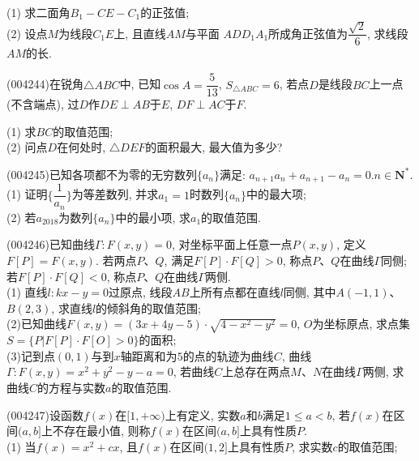 (1) 求二面角$B_1-CE-C_1$的正弦值;\\
(2) 设点$M$为线段$C_1E$上, 且直线$AM$与平面
$AD{D_1}{A_1}$所成角正弦值为$\dfrac{\sqrt 2}6$, 求线段$AM$的长.
\item (004244)在锐角$\triangle ABC$中, 已知$\cos A=\dfrac 5{13}$, $S_{\triangle ABC}=6$, 若点$D$是线段$BC$上一点(不含端点), 过$D$作$DE\perp AB$于$E$, $DF\perp AC$于$F$.
\begin{center}
\end{center}
(1) 求$BC$的取值范围;\\
(2) 问点$D$在何处时, $\triangle DEF$的面积最大, 最大值为多少?
\item (004245)已知各项都不为零的无穷数列$\{a_n\}$满足: ${a_{n+1}}a_n+{a_{n+1}}-a_n=0$.$n\in \mathbf{N}^*$.\\
(1) 证明$\{\dfrac 1{a_n}\}$为等差数列, 并求$a_1=1$时数列$\{a_n\}$中的最大项;\\
(2) 若$a_{2018}$为数列$\{a_n\}$中的最小项, 求$a_1$的取值范围.
\item (004246)已知曲线$\Gamma:F(x,y)=0$, 对坐标平面上任意一点$P(x,y)$, 定义$F[P]=F(x,y)$. 若两点$P$、$Q$, 满足$F[P]\cdot F[Q]>0$, 称点$P$、$Q$在曲线$\Gamma$同侧; 若$F[P]\cdot F[Q]<0$, 称点$P$、$Q$在曲线$\Gamma$两侧.\\
(1) 直线$l:kx-y=0$过原点, 线段$AB$上所有点都在直线$l$同侧, 其中$A(-1,1)$、$B(2,3)$, 求直线$l$的倾斜角的取值范围;\\
(2)已知曲线$F(x,y)=(3x+4y-5)\cdot \sqrt{4-x^2-y^2}=0$, $O$为坐标原点, 求点集$S=\{P|F[P]\cdot F[O]>0\}$的面积;\\
(3)记到点$(0,1)$与到$x$轴距离和为$5$的点的轨迹为曲线$C$, 曲线$\Gamma :F(x,y)=x^2+y^2-y-a=0$, 若曲线$C$上总存在两点$M$、$N$在曲线$\Gamma$两侧, 求曲线$C$的方程与实数$a$的取值范围.
\item (004247)设函数$f(x)$在$[1,+\infty)$上有定义, 实数$a$和$b$满足$1\le a<b$, 若$f(x)$在区间$(a,b]$上不存在最小值, 则称$f(x)$在区间$(a,b]$上具有性质$P$.\\
(1) 当$f(x)=x^2+cx$, 且$f(x)$在区间$(1,2]$上具有性质$P$, 求实数$c$的取值范围;\\

